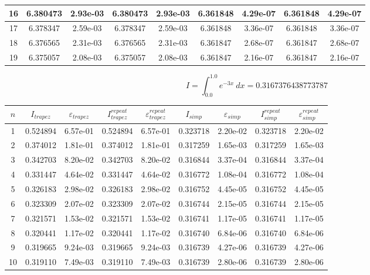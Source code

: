 \documentclass{report}[10pts]
\begin{document}
\begin{center}
\begin{tabular}{|c|c|c|c|c|c|c|c|c|}
   \hline
   16 & 6.380473 & 2.93e-03 & 6.380473 & 2.93e-03 & 6.361848 & 4.29e-07 & 6.361848 & 4.29e-07\\
   \hline
   17 & 6.378347 & 2.59e-03 & 6.378347 & 2.59e-03 & 6.361848 & 3.36e-07 & 6.361848 & 3.36e-07\\
   \hline
   18 & 6.376565 & 2.31e-03 & 6.376565 & 2.31e-03 & 6.361847 & 2.68e-07 & 6.361847 & 2.68e-07\\
   \hline
   19 & 6.375057 & 2.08e-03 & 6.375057 & 2.08e-03 & 6.361847 & 2.16e-07 & 6.361847 & 2.16e-07\\
   \hline
\end{tabular}\end{center}

\clearpage


\[
   I=\int_{0.0}^{1.0}e^{-3x}~dx
   =
   0.3167376438773787
\]
\begin{center}\begin{tabular}{|c|c|c|c|c|c|c|c|c|}
   \hline
   $n$ & $I_{trapez}$ & ${\varepsilon}_{trapez}$ & $I_{trapez}^{repeat}$ & ${\varepsilon}_{trapez}^{repeat}$ & $I_{simp}$ & ${\varepsilon}_{simp}$ & $I_{simp}^{repeat}$ & ${\varepsilon}_{simp}^{repeat}$\\
   \hline
   1 & 0.524894 & 6.57e-01 & 0.524894 & 6.57e-01 & 0.323718 & 2.20e-02 & 0.323718 & 2.20e-02\\
   \hline
   2 & 0.374012 & 1.81e-01 & 0.374012 & 1.81e-01 & 0.317259 & 1.65e-03 & 0.317259 & 1.65e-03\\
   \hline
   3 & 0.342703 & 8.20e-02 & 0.342703 & 8.20e-02 & 0.316844 & 3.37e-04 & 0.316844 & 3.37e-04\\
   \hline
   4 & 0.331447 & 4.64e-02 & 0.331447 & 4.64e-02 & 0.316772 & 1.08e-04 & 0.316772 & 1.08e-04\\
   \hline
   5 & 0.326183 & 2.98e-02 & 0.326183 & 2.98e-02 & 0.316752 & 4.45e-05 & 0.316752 & 4.45e-05\\
   \hline
   6 & 0.323309 & 2.07e-02 & 0.323309 & 2.07e-02 & 0.316744 & 2.15e-05 & 0.316744 & 2.15e-05\\
   \hline
   7 & 0.321571 & 1.53e-02 & 0.321571 & 1.53e-02 & 0.316741 & 1.17e-05 & 0.316741 & 1.17e-05\\
   \hline
   8 & 0.320441 & 1.17e-02 & 0.320441 & 1.17e-02 & 0.316740 & 6.84e-06 & 0.316740 & 6.84e-06\\
   \hline
   9 & 0.319665 & 9.24e-03 & 0.319665 & 9.24e-03 & 0.316739 & 4.27e-06 & 0.316739 & 4.27e-06\\
   \hline
   10 & 0.319110 & 7.49e-03 & 0.319110 & 7.49e-03 & 0.316739 & 2.80e-06 & 0.316739 & 2.80e-06\\

\end{tabular}
\end{center}
\end{document}
